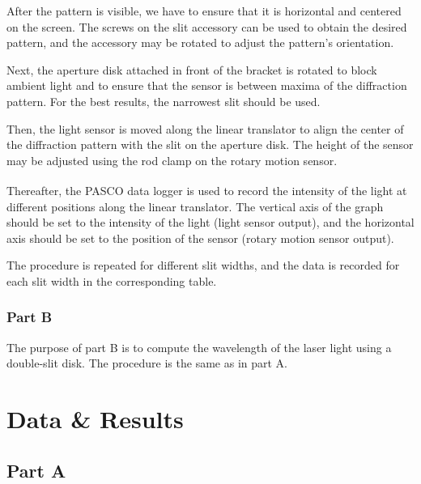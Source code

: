 \documentclass[10pt]{article}
\begin{document}
After the pattern is visible, we have to ensure that it is horizontal and centered on the screen. The screws on the slit accessory can be used to obtain the desired pattern, and the accessory may be rotated to adjust the pattern's orientation.

Next, the aperture disk attached in front of the bracket is rotated to block ambient light and to ensure that the sensor is between maxima of the diffraction pattern. For the best results, the narrowest slit should be used.

Then, the light sensor is moved along the linear translator to align the center of the diffraction pattern with the slit on the aperture disk. The height of the sensor may be adjusted using the rod clamp on the rotary motion sensor.

Thereafter, the PASCO{\textsuperscript\textregistered} data logger is used to record the intensity of the light at different positions along the linear translator. The vertical axis of the graph should be set to the intensity of the light (light sensor output), and the horizontal axis should be set to the position of the sensor (rotary motion sensor output).

The procedure is repeated for different slit widths, and the data is recorded for each slit width in the corresponding table.

\subsubsection*{Part B}

The purpose of part B is to compute the wavelength of the laser light using a double-slit disk. The procedure is the same as in part A.

\section{Data \& Results}

\subsection*{Part A}
\end{document}
